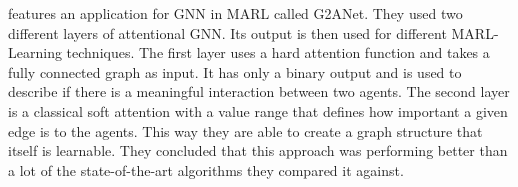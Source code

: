 \citet{G2ANet2020} features an application for GNN in MARL called G2ANet. They used two different layers of attentional GNN. Its output is then used for different MARL-Learning techniques. The first layer uses a hard attention function and takes a fully connected graph as input. It has only a binary output and is used to describe if there is a meaningful interaction between two agents. The second layer is a classical soft attention with a value range that defines how important a given edge is to the agents. This way they are able to create a graph structure that itself is learnable. They concluded that this approach was performing better than a lot of the state-of-the-art algorithms they compared it against.\par


